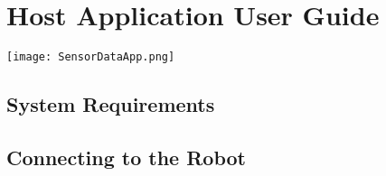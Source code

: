 \chapter{Host Application User Guide}
\label{Appendix E}

\begin{center}
	\texttt{[image: SensorDataApp.png]}
\end{center}


\section{System Requirements}


\section{Connecting to the Robot}

